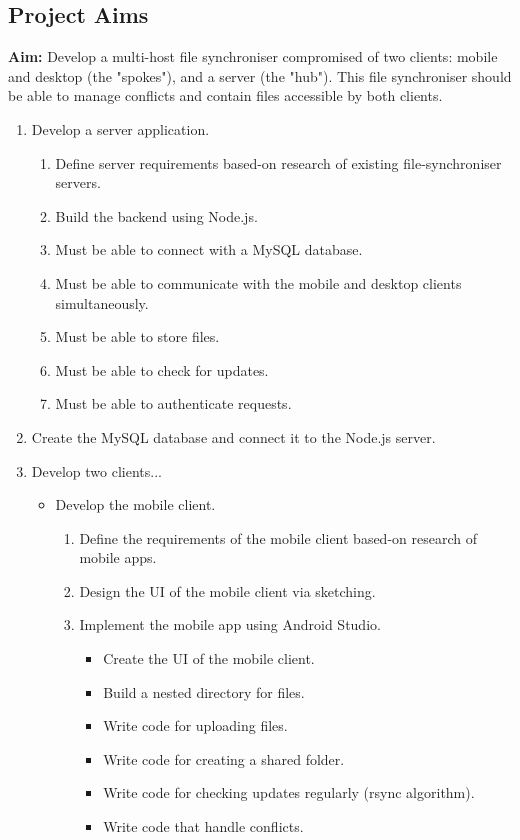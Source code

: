 \documentclass{article}
\begin{document}
	\subsection{Project Aims}
	\textbf{Aim: } Develop a multi-host file synchroniser compromised of two clients: mobile and desktop (the "spokes"), and a server (the "hub"). This file synchroniser should be able to manage conflicts and contain files accessible by both clients.
	\begin{enumerate}
	\item Develop a server application.
		\begin{enumerate}
		\item Define server requirements based-on research of existing file-synchroniser servers.
		\item Build the backend using Node.js.
		\item Must be able to connect with a MySQL database.
		\item Must be able to communicate with the mobile and desktop clients simultaneously.
		\item Must be able to store files.
		\item Must be able to check for updates.
		\item Must be able to authenticate requests. 
		\end{enumerate}
	\item Create the MySQL database and connect it to the Node.js server.
	\item Develop two clients...
		\begin{itemize}
		\item Develop the mobile client.
			\begin{enumerate}
			\item Define the requirements of the mobile client based-on research of mobile apps.
			\item Design the UI of the mobile client via sketching.
			\item Implement the mobile app using Android Studio.
				\begin{itemize}
				\item Create the UI of the mobile client.
				\item Build a nested directory for files.
				\item Write code for uploading files.
				\item Write code for creating a shared folder.
				\item Write code for checking updates regularly (rsync algorithm).
				\item Write code that handle conflicts.

\end{itemize}
\end{enumerate}
\end{itemize}
\end{enumerate}
\end{document}
